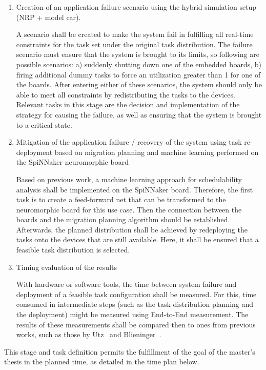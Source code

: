 \begin{enumerate}
\item	Creation of an application failure scenario using the hybrid simulation setup (NRP + model car).

A scenario shall be created to make the system fail in fulfilling all real-time constraints for the task set under the original task distribution. The failure scenario must ensure that the system is brought to its limits, so following are possible scenarios: a) suddenly shutting down one of the embedded boards, b) firing additional dummy tasks to force an utilization greater than 1 for one of the boards. After entering either of these scenarios, the system should only be able to meet all constraints by redistributing the tasks to the devices. Relevant tasks in this stage are the decision and implementation of the strategy for causing the failure, as well as ensuring that the system is brought to a critical state.

\item	Mitigation of the application failure / recovery of the system using task re-deployment based on migration planning and machine learning performed on the SpiNNaker neuromorphic board

Based on previous work, a machine learning approach for schedulability analysis shall be implemented on the SpiNNaker board. Therefore, the first task is to create a feed-forward net that can be transformed to the neuromorphic board for this use case. Then the connection between the boards and the migration planning algorithm should be established. Afterwards, the planned distribution shall be achieved by redeploying the tasks onto the devices that are still available. Here, it shall be ensured that a feasible task distribution is selected.

\item	Timing evaluation of the results

With hardware or software tools, the time between system failure and deployment of a feasible task configuration shall be measured. For this, time consumed in intermediate steps (such as the task distribution planning and the deployment) might be measured using End-to-End measurement. The results of these measurements shall be compared then to ones from previous works, such as those by Utz~\parencite{utz1} and Blieninger~\parencite{blieninger1}.
\end{enumerate}

This stage and task definition permits the fulfillment of the goal of the master’s thesis in the planned time, as detailed in the time plan below. 

